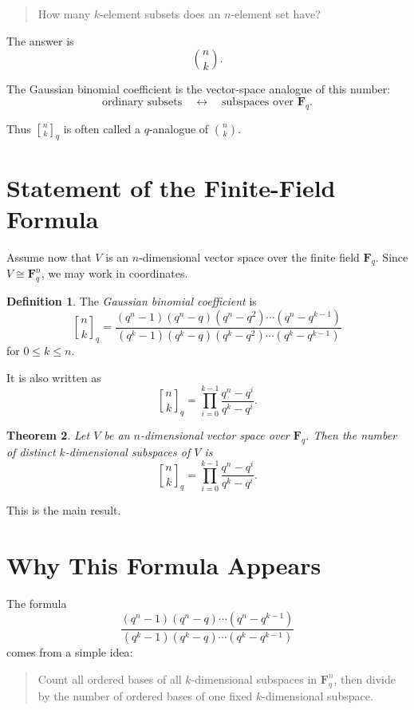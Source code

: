 \documentclass[11pt]{article}
\newtheorem{theorem}{Theorem}[section]
\theoremstyle{definition}
\newtheorem{definition}[theorem]{Definition}
\theoremstyle{remark}
\newcommand{\F}{\mathbf{F}}
\newcommand{\qbinom}[2]{\genfrac{[}{]}{0pt}{}{#1}{#2}_q}
\begin{document}
	\begin{quote}
		How many \(k\)-element subsets does an \(n\)-element set have?
	\end{quote}
	
	The answer is
	\[
	\binom{n}{k}.
	\]
	
	The Gaussian binomial coefficient is the vector-space analogue of this number:
	\[
	\text{ordinary subsets} \quad \longleftrightarrow \quad \text{subspaces over } \F_q.
	\]
	
	Thus \(\qbinom{n}{k}\) is often called a \(q\)-analogue of \(\binom{n}{k}\).
	
	\section{Statement of the Finite-Field Formula}
	
	Assume now that \(V\) is an \(n\)-dimensional vector space over the finite field \(\F_q\). Since \(V\cong \F_q^n\), we may work in coordinates.
	
	\begin{definition}
		The \emph{Gaussian binomial coefficient} is
		\[
		\qbinom{n}{k}
		=
		\frac{(q^n-1)(q^n-q)(q^n-q^2)\cdots(q^n-q^{k-1})}
		{(q^k-1)(q^k-q)(q^k-q^2)\cdots(q^k-q^{k-1})}
		\]
		for \(0\le k\le n\).
	\end{definition}
	
	It is also written as
	\[
	\qbinom{n}{k}
	=
	\prod_{i=0}^{k-1}\frac{q^n-q^i}{q^k-q^i}.
	\]
	
	\begin{theorem}
		Let \(V\) be an \(n\)-dimensional vector space over \(\F_q\). Then the number of distinct \(k\)-dimensional subspaces of \(V\) is
		\[
		\boxed{
			\qbinom{n}{k}
			=
			\prod_{i=0}^{k-1}\frac{q^n-q^i}{q^k-q^i}
		}.
		\]
	\end{theorem}
	
	This is the main result.
	
	\section{Why This Formula Appears}
	
	The formula
	\[
	\frac{(q^n-1)(q^n-q)\cdots(q^n-q^{k-1})}
	{(q^k-1)(q^k-q)\cdots(q^k-q^{k-1})}
	\]
	comes from a simple idea:
	
	\begin{quote}
		Count all ordered bases of all \(k\)-dimensional subspaces in \(\F_q^n\), then divide by the number of ordered bases of one fixed \(k\)-dimensional subspace.
	\end{quote}
	
\end{document}
